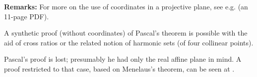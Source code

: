 \documentclass[12pt]{article}
\begin{document}
\textbf{Remarks: }For more on the use of coordinates in a projective
plane, see e.g. 
(an 11-page PDF).

A synthetic proof (without coordinates) of Pascal's theorem
is possible with the aid of cross ratios or the related notion
of harmonic sets (of four collinear points).

Pascal's proof is lost; presumably he had only the real affine plane
in mind. A proof restricted to that case, based on Menelaus's theorem,
can be seen at
.
\end{document}

